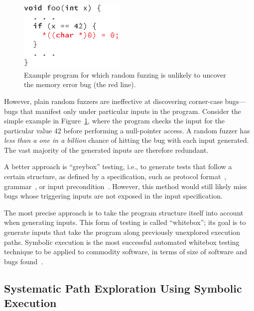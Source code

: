 \begin{figure}
  \centering
  \includegraphics[width=2.0in]{introduction/figures/fuzzing-example}
  \caption{Example program for which random fuzzing is unlikely to uncover the memory error bug (the red line).}
  \label{fig:intro:fuzzing}
\end{figure}

However, plain random fuzzers are ineffective at discovering corner-case bugs---bugs that manifest only under particular inputs in the program.
%
Consider the simple example in Figure~\ref{fig:intro:fuzzing}, where the program checks the input for the particular value 42 before performing a null-pointer access.  A random fuzzer has \emph{less than a one in a billion} chance of hitting the bug with each input generated.
%
The vast majority of the generated inputs are therefore redundant.

A better approach is ``greybox'' testing, i.e., to generate tests that follow a certain structure, as defined by a specification, such as protocol format~\cite{sulley}, grammar~\cite{quickcheck}, or input precondition~\cite{boyapati:korat}.
%
However, this method would still likely miss bugs whose triggering inputs are not exposed in the input specification.

The most precise approach is to take the program structure itself into account when generating inputs.
%
This form of testing is called ``whitebox''; its goal is to generate inputs that take the program along previously unexplored execution paths.
%
Symbolic execution is the most successful automated whitebox testing technique to be applied to commodity software, in terms of size of software and bugs found~\cite{sage2012,all-symbex,decades-symbex,practice-symbex}.

\subsection{Systematic Path Exploration Using Symbolic Execution}
\label{sec:intro:symbex}

